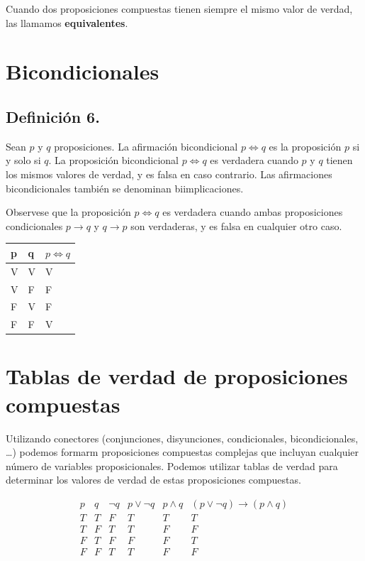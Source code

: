 \documentclass[
  letterpaper,
  DIV=11,
  numbers=noendperiod]{scrartcl}
\begin{document}
Cuando dos proposiciones compuestas tienen siempre el mismo valor de
verdad, las llamamos \textbf{equivalentes}.

\section{Bicondicionales}\label{bicondicionales}

\subsection{Definición 6.}\label{definiciuxf3n-6.}

Sean \(p\) y \(q\) proposiciones. La afirmación bicondicional
\(p \iff q\) es la proposición \(p\) si y solo si \(q\). La proposición
bicondicional \(p \iff q\) es verdadera cuando \(p\) y \(q\) tienen los
mismos valores de verdad, y es falsa en caso contrario. Las afirmaciones
bicondicionales también se denominan biimplicaciones.

Observese que la proposición \(p \iff q\) es verdadera cuando ambas
proposiciones condicionales \(p \to q\) y \(q \to p\) son verdaderas, y
es falsa en cualquier otro caso.

\begin{longtable}[]{@{}lll@{}}
\toprule\noalign{}
p & q & \(p \iff q\) \\
\midrule\noalign{}
\endhead
\bottomrule\noalign{}
\endlastfoot
V & V & V \\
V & F & F \\
F & V & F \\
F & F & V \\
\end{longtable}

\section{Tablas de verdad de proposiciones
compuestas}\label{tablas-de-verdad-de-proposiciones-compuestas}

Utilizando conectores (conjunciones, disyunciones, condicionales,
bicondicionales, \ldots) podemos formarm proposiciones compuestas
complejas que incluyan cualquier número de variables proposicionales.
Podemos utilizar tablas de verdad para determinar los valores de verdad
de estas proposiciones compuestas.

\[
\begin{array}{c|c|c|c|c|c}
p & q & \neg q & p \lor \neg q & p \land q & (p \lor \neg q) \rightarrow (p \land q) \\
\hline
T & T & F & T & T & T \\
T & F & T & T & F & F \\
F & T & F & F & F & T \\
F & F & T & T & F & F \\
\end{array}
\]
\end{document}
